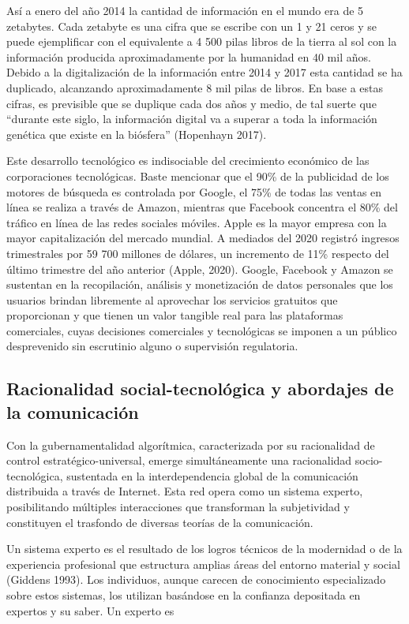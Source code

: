 \documentclass[
]{interact}
\begin{document}
Así a enero del año 2014 la cantidad de información en el mundo era de 5
zetabytes. Cada zetabyte es una cifra que se escribe con un 1 y 21 ceros
y se puede ejemplificar con el equivalente a 4 500 pilas libros de la
tierra al sol con la información producida aproximadamente por la
humanidad en 40 mil años. Debido a la digitalización de la información
entre 2014 y 2017 esta cantidad se ha duplicado, alcanzando
aproximadamente 8 mil pilas de libros. En base a estas cifras, es
previsible que se duplique cada dos años y medio, de tal suerte que
``durante este siglo, la información digital va a superar a toda la
información genética que existe en la biósfera'' (Hopenhayn 2017).

Este desarrollo tecnológico es indisociable del crecimiento económico de
las corporaciones tecnológicas. Baste mencionar que el 90\% de la
publicidad de los motores de búsqueda es controlada por Google, el 75\%
de todas las ventas en línea se realiza a través de Amazon, mientras que
Facebook concentra el 80\% del tráfico en línea de las redes sociales
móviles. Apple es la mayor empresa con la mayor capitalización del
mercado mundial. A mediados del 2020 registró ingresos trimestrales por
59 700 millones de dólares, un incremento de 11\% respecto del último
trimestre del año anterior (Apple, 2020). Google, Facebook y Amazon se
sustentan en la recopilación, análisis y monetización de datos
personales que los usuarios brindan libremente al aprovechar los
servicios gratuitos que proporcionan y que tienen un valor tangible real
para las plataformas comerciales, cuyas decisiones comerciales y
tecnológicas se imponen a un público desprevenido sin escrutinio alguno
o supervisión regulatoria.

\subsection{Racionalidad social-tecnológica y abordajes de la
comunicación}\label{racionalidad-social-tecnoluxf3gica-y-abordajes-de-la-comunicaciuxf3n}

Con la gubernamentalidad algorítmica, caracterizada por su racionalidad
de control estratégico-universal, emerge simultáneamente una
racionalidad socio-tecnológica, sustentada en la interdependencia global
de la comunicación distribuida a través de Internet. Esta red opera como
un sistema experto, posibilitando múltiples interacciones que
transforman la subjetividad y constituyen el trasfondo de diversas
teorías de la comunicación.

Un sistema experto es el resultado de los logros técnicos de la
modernidad o de la experiencia profesional que estructura amplias áreas
del entorno material y social (Giddens 1993). Los individuos, aunque
carecen de conocimiento especializado sobre estos sistemas, los utilizan
basándose en la confianza depositada en expertos y su saber. Un experto
es
\end{document}
